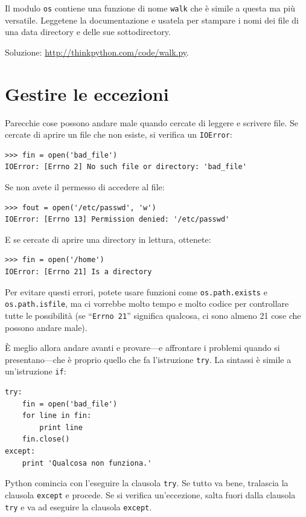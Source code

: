 \documentclass[10pt]{book}
\begin{document}
\vspace{0.2in}
\begin{exercise}

Il modulo {\tt os} contiene una funzione di nome {\tt walk}
che è simile a questa ma più versatile. Leggetene la documentazione e usatela per stampare i nomi dei file di una data directory e delle sue sottodirectory. 

Soluzione: \url{http://thinkpython.com/code/walk.py}.

\end{exercise}


\section{Gestire le eccezioni}
\label{catch}

Parecchie cose possono andare male quando cercate di leggere e scrivere  file. Se cercate di aprire un file che non esiste, si verifica un
{\tt IOError}:

\begin{verbatim}
>>> fin = open('bad_file')
IOError: [Errno 2] No such file or directory: 'bad_file'
\end{verbatim}
%
Se non avete il permesso di accedere al file:

\begin{verbatim}
>>> fout = open('/etc/passwd', 'w')
IOError: [Errno 13] Permission denied: '/etc/passwd'
\end{verbatim}
%
E se cercate di aprire una directory in lettura, ottenete:

\begin{verbatim}
>>> fin = open('/home')
IOError: [Errno 21] Is a directory
\end{verbatim}
%
Per evitare questi errori, potete usare funzioni come {\tt os.path.exists}
e {\tt os.path.isfile}, ma ci vorrebbe molto tempo e molto codice per controllare tutte le possibilità (se ``{\tt Errno 21}'' significa qualcosa, ci sono almeno 21 cose che possono andare male).

È meglio allora andare avanti e provare---e affrontare i problemi quando si presentano---che è proprio quello che fa l'istruzione {\tt try}. La sintassi è simile a un'istruzione {\tt if}:

\begin{verbatim}
try:    
    fin = open('bad_file')
    for line in fin:
        print line
    fin.close()
except:
    print 'Qualcosa non funziona.'
\end{verbatim}
%
Python comincia con l'eseguire la clausola {\tt try}.  Se tutto va bene, tralascia la clausola {\tt except} e procede. Se si verifica un'eccezione, salta fuori dalla clausola {\tt try} e va ad eseguire la clausola {\tt except}.
\end{document}
